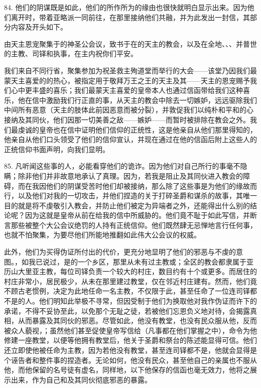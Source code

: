 84. 他们的阴谋既是如此，他们的所作所为的缘由也很快就明白显示出来。因为他们离开时，带着亚略派一同前往，在那里接纳他们共融，并为此发出一封信，其部分内容及开头如下。\par

由天主恩宠聚集于的神圣公会议，致书于在的天主的教会，以及在全地、、、并普世的主教、司铎和执事，在主内祝你们平安。\par

我们来自不同行省，聚集参加为祝圣救主殉道堂而举行的大会——该堂乃因我们最蒙天主喜爱的的热心，被指定用于敬拜万王之王的天主及其——天主的恩宠赐予我们心中更丰盛的喜乐；我们最蒙天主喜爱的皇帝本人也通过信函带给我们这种喜乐，他在信中激励我们行正直的事，从天主的教会中除去一切嫉妒，远远驱除我们中间所有恶意（天主的肢体此前因恶意而被分裂），并敦促我们以纯朴和平和的心接纳及其同伙，他们因那一切美善之敌——嫉妒——而暂时被排除在教会之外。我们最虔诚的皇帝也在信中证明他们信仰的正统性，这是他亲自从他们那里得知的，他亲自从他们口头领受了他们的信仰宣认，并现在通过在他的信函后附上这些人的正统信仰书面声明，向我们显明。\par

85. 凡听闻这些事的人，必能看穿他们的诡诈。因为他们对自己所行的事毫不隐瞒；除非他们并非故意地承认了真理。因为，若我是阻止及其同伙进入教会的障碍，而在我因他们的阴谋受苦时他们却被接纳，那么除了这些事是为他们的缘故而行，以及他们对我的一切攻击，并他们捏造的关于打碎圣爵和谋杀的故事，其唯一目的就是将不虔敬引入教会，并防止他们被定为异端者之外，还能得出什么别的结论呢？因为这就是皇帝从前在给我的信中所威胁的。他们竟不耻于如此写信，并断言那些被整个大公会议绝罚的人持有正统信仰。他们既然肆无忌惮地言行任何事，也就不怕聚集，为要尽他们所能地推翻如此伟大公会议的权威。\par

此外，他们为买得伪证所付出的代价，更充分地显明了他们的邪恶与不虔的意图。，如我已说过，是的一个乡区，那里从未有过主教或；全区的教会都隶属于亚历山大里亚主教，每位司铎负责一个较大的村庄，数目约有十个或更多。而居住的村庄非常小，居民极少，从未在那里建过教堂，仅在邻近村庄建有。然而，他们竟不顾古老惯例，决定为此地任命一名主教，不仅限于此，甚至任命了一位连司铎都不是的人。他们明知此举极不寻常，但因受制于他们为换取他对我作伪证而许下的承诺，不得不妥协至此，以免那个无耻之徒，若被他们忘恩负义地对待，会揭露真相，从而暴露及其同伙的邪恶。尽管如此，他没有教堂，也没有民众服从他，反而被众人藐视，；虽然他们甚至促使皇帝写信给（凡事都在他们掌握之中），命令为他修建一座教堂，以便等他拥有教堂后，他关于圣爵和祭台的陈述能显得可信。他们还立即使他被任命为主教，因为若他没有教堂，甚至连司铎都不是，他就会显得是个诬告者和整件事的捏造者。无论如何，他没有民众，甚至他自己的亲属也不服从他，而他保留的名号徒有虚名，同样地，以下他保存的信函也毫无效力，他将之展示出来，作为自己和及其同伙彻底邪恶的暴露。\par

